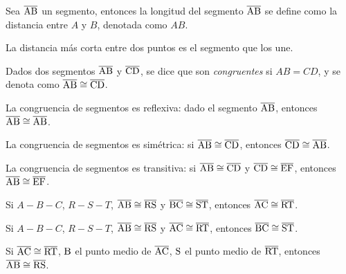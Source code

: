 \begin{definition}
    Sea $\overline{\rm AB}$ un segmento, entonces la longitud del segmento $\overline{\rm AB}$ se define como la distancia entre $A$ y $B$, denotada como $AB$.
\end{definition}

\begin{postulate}
La distancia más corta entre dos puntos es el segmento que los une.
\end{postulate}

\begin{definition}
    Dados dos segmentos $\overline{\rm AB}$ y $\overline{\rm CD}$, se dice que son \textit{congruentes} si $AB = CD$, y se denota  como $\overline{\rm AB} \cong \overline{\rm CD}$.
\end{definition}

\begin{theorem}
    La congruencia de segmentos es reflexiva: dado el segmento $\overline{\rm AB}$, entonces $\overline{\rm AB} \cong \overline{\rm AB}$.
\end{theorem}

\begin{theorem}
    La congruencia de segmentos es simétrica: si $\overline{\rm AB} \cong \overline{\rm CD}$, entonces $\overline{\rm CD} \cong \overline{\rm AB}$.
\end{theorem}

\begin{theorem}
    La congruencia de segmentos es transitiva: si $\overline{\rm AB} \cong \overline{\rm CD}$ y $\overline{\rm CD} \cong \overline{\rm EF}$, entonces $\overline{\rm AB} \cong \overline{\rm EF}$.
\end{theorem}

\begin{theorem}
    Si $A-B-C$, $R-S-T$, $\overline{\rm AB} \cong \overline{\rm RS}$ y $\overline{\rm BC} \cong \overline{\rm ST}$, entonces $\overline{\rm AC} \cong \overline{\rm RT}$.
\end{theorem}

\begin{theorem}
    Si $A-B-C$, $R-S-T$, $\overline{\rm AB} \cong \overline{\rm RS}$ y $\overline{\rm AC} \cong \overline{\rm RT}$, entonces $\overline{\rm BC} \cong \overline{\rm ST}$.
\end{theorem}

\begin{theorem}
    Si $\overline{\rm AC} \cong \overline{\rm RT}$, $\rm B$ el punto medio de $\overline{\rm AC}$, $\rm S$ el punto medio de $\overline{\rm RT}$, entonces $\overline{\rm AB} \cong \overline{\rm RS}$.
\end{theorem}

